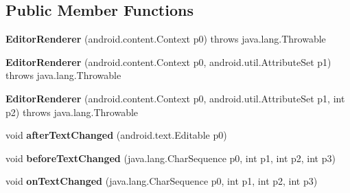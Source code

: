 \subsection*{Public Member Functions}
\begin{DoxyCompactItemize}
\item 
\hypertarget{classmd5282f1122c1313907b9bf274dd2c2f344_1_1EditorRenderer_a2ea752dd22b7115060d4c6106f3a0c81}{}{\bfseries Editor\+Renderer} (android.\+content.\+Context p0)  throws java.\+lang.\+Throwable 	\label{classmd5282f1122c1313907b9bf274dd2c2f344_1_1EditorRenderer_a2ea752dd22b7115060d4c6106f3a0c81}

\item 
\hypertarget{classmd5282f1122c1313907b9bf274dd2c2f344_1_1EditorRenderer_aebf14dbad2117271bd53a2bd5af58160}{}{\bfseries Editor\+Renderer} (android.\+content.\+Context p0, android.\+util.\+Attribute\+Set p1)  throws java.\+lang.\+Throwable 	\label{classmd5282f1122c1313907b9bf274dd2c2f344_1_1EditorRenderer_aebf14dbad2117271bd53a2bd5af58160}

\item 
\hypertarget{classmd5282f1122c1313907b9bf274dd2c2f344_1_1EditorRenderer_a777f8ee99607e5937318464c7a07d6f6}{}{\bfseries Editor\+Renderer} (android.\+content.\+Context p0, android.\+util.\+Attribute\+Set p1, int p2)  throws java.\+lang.\+Throwable 	\label{classmd5282f1122c1313907b9bf274dd2c2f344_1_1EditorRenderer_a777f8ee99607e5937318464c7a07d6f6}

\item 
\hypertarget{classmd5282f1122c1313907b9bf274dd2c2f344_1_1EditorRenderer_a5b9e4478ad70f84c107df6a88e336b36}{}void {\bfseries after\+Text\+Changed} (android.\+text.\+Editable p0)\label{classmd5282f1122c1313907b9bf274dd2c2f344_1_1EditorRenderer_a5b9e4478ad70f84c107df6a88e336b36}

\item 
\hypertarget{classmd5282f1122c1313907b9bf274dd2c2f344_1_1EditorRenderer_ab5d7d31a09e89a4191c3124e774fb476}{}void {\bfseries before\+Text\+Changed} (java.\+lang.\+Char\+Sequence p0, int p1, int p2, int p3)\label{classmd5282f1122c1313907b9bf274dd2c2f344_1_1EditorRenderer_ab5d7d31a09e89a4191c3124e774fb476}

\item 
\hypertarget{classmd5282f1122c1313907b9bf274dd2c2f344_1_1EditorRenderer_a963a88802bcfeb3f6c4b7f1be9f8c3ce}{}void {\bfseries on\+Text\+Changed} (java.\+lang.\+Char\+Sequence p0, int p1, int p2, int p3)\label{classmd5282f1122c1313907b9bf274dd2c2f344_1_1EditorRenderer_a963a88802bcfeb3f6c4b7f1be9f8c3ce}


\end{DoxyCompactItemize}

